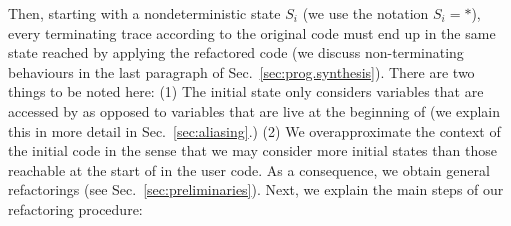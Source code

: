 \documentclass[runningheads,a4paper]{llncs}
\begin{document}
Then, starting with a nondeterministic 
state $S_i$ (we use the notation $S_i{=}*$), every terminating trace according to the original code must end up in the same state
reached by applying the refactored code
(we discuss non-terminating behaviours in the last
paragraph of Sec.~\ref{sec:prog.synthesis}).
%
There are two things to be noted here:
(1) The initial state only considers variables that
are accessed by  as opposed to variables
that are live at the beginning of 
(we explain this in more detail in Sec.~\ref{sec:aliasing}.)
(2) We overapproximate the context of the initial code
in the sense that we may consider more initial states than
those reachable at the start of  in the user code.  
As a consequence, we obtain general refactorings (see Sec.~\ref{sec:preliminaries}).
%
%
%
%
Next, we explain the main steps of our refactoring procedure:
\end{document}
